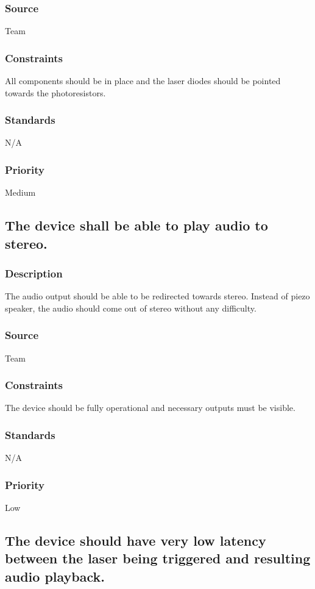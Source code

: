 \subsubsection{Source}
Team
\subsubsection{Constraints}
All components should be in place and the laser diodes should be pointed towards the photoresistors.
\subsubsection{Standards}
N/A
\subsubsection{Priority}
Medium

\subsection{The device shall be able to play audio to stereo.}
\subsubsection{Description}
The audio output should be able to be redirected towards stereo. Instead of piezo speaker, the audio should come out of stereo without any difficulty.
\subsubsection{Source}
Team
\subsubsection{Constraints}
The device should be fully operational and necessary outputs must be visible.
\subsubsection{Standards}
N/A
\subsubsection{Priority}
Low

\subsection{The device should have very low latency between the laser being triggered and resulting audio playback.}
